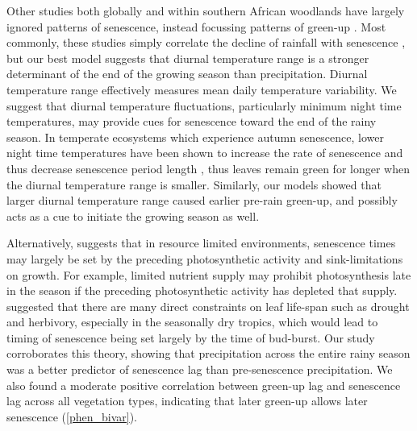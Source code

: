 \documentclass[11pt,a4paper]{article}
\begin{document}

Other studies both globally and within southern African woodlands have largely ignored patterns of senescence, instead focussing patterns of green-up \citep{Gallinat2015}. Most commonly, these studies simply correlate the decline of rainfall with senescence \citep{Stevens2016, Guan2014}, but our best model suggests that diurnal temperature range is a stronger determinant of the end of the growing season than precipitation. Diurnal temperature range effectively measures mean daily temperature variability. We suggest that diurnal temperature fluctuations, particularly minimum night time temperatures, may provide cues for senescence toward the end of the rainy season. In temperate ecosystems which experience autumn senescence, lower night time temperatures have been shown to increase the rate of senescence and thus decrease senescence period length \citep{Michelson2017, Escamilla2020}, thus leaves remain green for longer when the diurnal temperature range is smaller. Similarly, our models showed that larger diurnal temperature range caused earlier pre-rain green-up, and possibly acts as a cue to initiate the growing season as well.

Alternatively, \citet{Zani2020} suggests that in resource limited environments, senescence times may largely be set by the preceding photosynthetic activity and sink-limitations on growth. For example, limited nutrient supply may prohibit photosynthesis late in the season if the preceding photosynthetic activity has depleted that supply. \citet{Reich1992} suggested that there are many direct constraints on leaf life-span such as drought and herbivory, especially in the seasonally dry tropics, which would lead to timing of senescence being set largely by the time of bud-burst. Our study corroborates this theory, showing that precipitation across the entire rainy season was a better predictor of senescence lag than pre-senescence precipitation. We also found a moderate positive correlation between green-up lag and senescence lag across all vegetation types, indicating that later green-up allows later senescence (\autoref{phen_bivar}).
\end{document}
